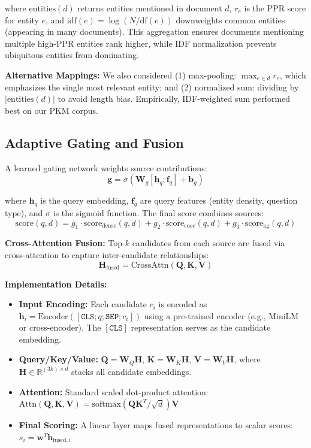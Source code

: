 \documentclass[11pt,a4paper]{article}
\begin{document}
where $\text{entities}(d)$ returns entities mentioned in document $d$, $r_e$ is the PPR score for entity $e$, and $\text{idf}(e) = \log(N / \text{df}(e))$ downweights common entities (appearing in many documents). This aggregation ensures documents mentioning multiple high-PPR entities rank higher, while IDF normalization prevents ubiquitous entities from dominating.

\textbf{Alternative Mappings:} We also considered (1) max-pooling: $\max_{e \in d} r_e$, which emphasizes the single most relevant entity; and (2) normalized sum: dividing by $|\text{entities}(d)|$ to avoid length bias. Empirically, IDF-weighted sum performed best on our PKM corpus.

\subsection{Adaptive Gating and Fusion}
\label{sec:gating}

A learned gating network weights source contributions:
\begin{equation}
\mathbf{g} = \sigma(\mathbf{W}_g [\mathbf{h}_q; \mathbf{f}_q] + \mathbf{b}_g)
\end{equation}

where $\mathbf{h}_q$ is the query embedding, $\mathbf{f}_q$ are query features (entity density, question type), and $\sigma$ is the sigmoid function. The final score combines sources:
\begin{equation}
\text{score}(q, d) = g_1 \cdot \text{score}_{\text{dense}}(q, d) + g_2 \cdot \text{score}_{\text{cooc}}(q, d) + g_3 \cdot \text{score}_{\text{kg}}(q, d)
\end{equation}

\textbf{Cross-Attention Fusion:} Top-$k$ candidates from each source are fused via cross-attention to capture inter-candidate relationships:
\begin{equation}
\mathbf{H}_{\text{fused}} = \text{CrossAttn}(\mathbf{Q}, \mathbf{K}, \mathbf{V})
\end{equation}

\textbf{Implementation Details:}
\begin{itemize}
    \item \textbf{Input Encoding:} Each candidate $c_i$ is encoded as $\mathbf{h}_i = \text{Encoder}([\texttt{CLS}; q; \texttt{SEP}; c_i])$ using a pre-trained encoder (e.g., MiniLM or cross-encoder). The $[\texttt{CLS}]$ representation serves as the candidate embedding.
    \item \textbf{Query/Key/Value:} $\mathbf{Q} = \mathbf{W}_Q \mathbf{H}$, $\mathbf{K} = \mathbf{W}_K \mathbf{H}$, $\mathbf{V} = \mathbf{W}_V \mathbf{H}$, where $\mathbf{H} \in \mathbb{R}^{(3k) \times d}$ stacks all candidate embeddings.
    \item \textbf{Attention:} Standard scaled dot-product attention: $\text{Attn}(\mathbf{Q}, \mathbf{K}, \mathbf{V}) = \text{softmax}(\mathbf{Q}\mathbf{K}^T / \sqrt{d})\mathbf{V}$
    \item \textbf{Final Scoring:} A linear layer maps fused representations to scalar scores: $s_i = \mathbf{w}^T \mathbf{h}_{\text{fused},i}$
\end{itemize}
\end{document}
